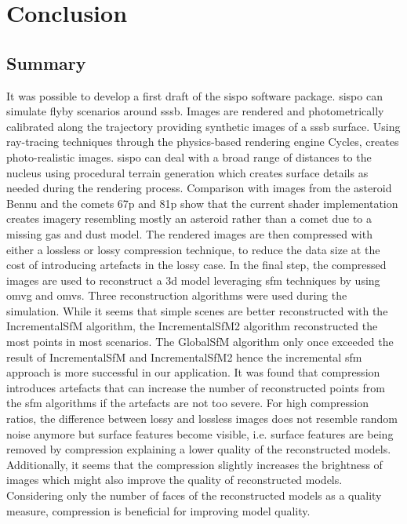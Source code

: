 \section{Conclusion} \label{sec:conclusion}
\subsection{Summary}
It was possible to develop a first draft of the \gls{sispo} software package. \Gls{sispo} can simulate flyby scenarios around \gls{sssb}. Images are rendered and photometrically calibrated along the trajectory providing synthetic images of a \gls{sssb} surface. Using ray-tracing techniques through the physics-based rendering engine Cycles, creates photo-realistic images. \Gls{sispo} can deal with a broad range of distances to the nucleus using procedural terrain generation which creates surface details as needed during the rendering process. Comparison with images from the asteroid Bennu and the comets \gls{67p} and \gls{81p} show that the current shader implementation creates imagery resembling mostly an asteroid rather than a comet due to a missing gas and dust model. The rendered images are then compressed with either a lossless or lossy compression technique, to reduce the data size at the cost of introducing artefacts in the lossy case. In the final step, the compressed images are used to reconstruct a \gls{3d} model leveraging \gls{sfm} techniques by using \gls{omvg} and \gls{omvs}. Three reconstruction algorithms were used during the simulation. While it seems that simple scenes are better reconstructed with the IncrementalSfM algorithm, the IncrementalSfM2 algorithm reconstructed the most points in most scenarios. The GlobalSfM algorithm only once exceeded the result of IncrementalSfM and IncrementalSfM2 hence the incremental \gls{sfm} approach is more successful in our application. It was found that compression introduces artefacts that can increase the number of reconstructed points from the \gls{sfm} algorithms if the artefacts are not too severe. For high compression ratios, the difference between lossy and lossless images does not resemble random noise anymore but surface features become visible, i.e. surface features are being removed by compression explaining a lower quality of the reconstructed models. Additionally, it seems that the compression slightly increases the brightness of images which might also improve the quality of reconstructed models. Considering only the number of faces of the reconstructed models as a quality measure, compression is beneficial for improving model quality.
